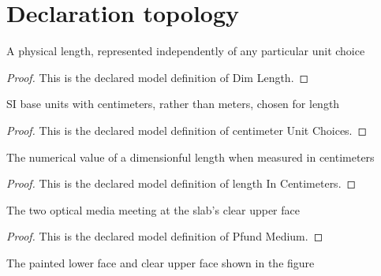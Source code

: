 \section{Declaration topology}
\begin{definition}
  \label{def:physics:phyx-mini-0022:phyxminiproblems-problemphyxmini0022-dimlength}
  A physical length, represented independently of any particular unit choice
\end{definition}
\begin{proof}
  This is the declared model definition of Dim Length.
\end{proof}
\begin{definition}
  \label{def:physics:phyx-mini-0022:phyxminiproblems-problemphyxmini0022-centimeterunitchoices}
  SI base units with centimeters, rather than meters, chosen for length
\end{definition}
\begin{proof}
  This is the declared model definition of centimeter Unit Choices.
\end{proof}
\begin{definition}
  \label{def:physics:phyx-mini-0022:phyxminiproblems-problemphyxmini0022-lengthincentimeters}
  The numerical value of a dimensionful length when measured in centimeters
\end{definition}
\begin{proof}
  This is the declared model definition of length In Centimeters.
\end{proof}
\begin{definition}
  \label{def:physics:phyx-mini-0022:phyxminiproblems-problemphyxmini0022-pfundmedium}
  The two optical media meeting at the slab's clear upper face
\end{definition}
\begin{proof}
  This is the declared model definition of Pfund Medium.
\end{proof}
\begin{definition}
  \label{def:physics:phyx-mini-0022:phyxminiproblems-problemphyxmini0022-slabface}
  The painted lower face and clear upper face shown in the figure
\end{definition}
